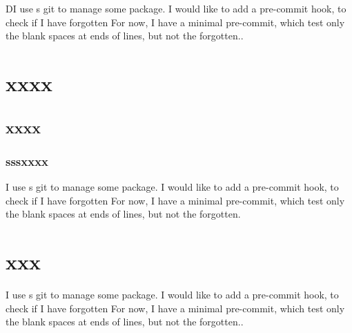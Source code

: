 \documentclass[a4paper, twoside, 12pt]{book}
\begin{document}
DI use s git to manage some package.
I would like to add a pre-commit hook, to check if I have forgotten
For now, I have a minimal pre-commit, which test only the blank spaces at ends of lines, but not the forgotten..

\section*{xxxx}
\subsection*{xxxx}
\subsubsection{sssxxxx}
I use s git to manage some package.
I would like to add a pre-commit hook, to check if I have forgotten
For now, I have a minimal pre-commit, which test only the blank spaces at ends of lines, but not the forgotten.

\section{xxx}

I use s git to manage some package.
I would like to add a pre-commit hook, to check if I have forgotten
For now, I have a minimal pre-commit, which test only the blank spaces at ends of lines, but not the forgotten..
\end{document}
